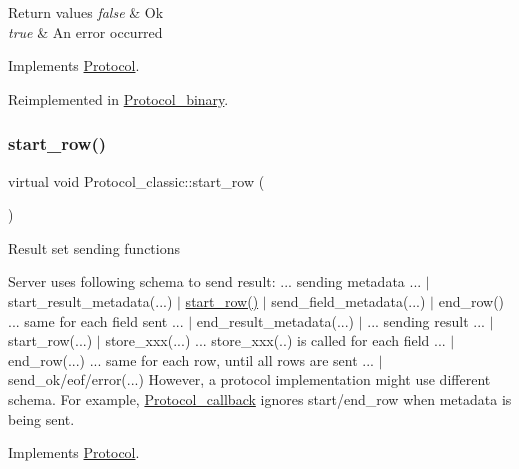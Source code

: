 \begin{DoxyRetVals}{Return values}
{\em false} & Ok \\
\hline
{\em true} & An error occurred \\
\hline
\end{DoxyRetVals}


Implements \mbox{\hyperlink{classProtocol_aa815f52ff0474421cd5db5ea5da84a85}{Protocol}}.



Reimplemented in \mbox{\hyperlink{classProtocol__binary_a2edc9bbded2ebdb50ccdcce29630d5f5}{Protocol\+\_\+binary}}.

\mbox{\label{classProtocol__classic_acebdc50db1e9403c19bb8909af300fec}} 
\subsubsection{\texorpdfstring{start\+\_\+row()}{start\_row()}}
{\footnotesize\ttfamily virtual void Protocol\+\_\+classic\+::start\+\_\+row (\begin{DoxyParamCaption}{ }\end{DoxyParamCaption})\hspace{0.3cm}{\ttfamily [pure virtual]}}

Result set sending functions

Server uses following schema to send result\+: ... sending metadata ... $\vert$ start\+\_\+result\+\_\+metadata(...) $\vert$ \mbox{\hyperlink{classProtocol__classic_acebdc50db1e9403c19bb8909af300fec}{start\+\_\+row()}} $\vert$ send\+\_\+field\+\_\+metadata(...) $\vert$ end\+\_\+row() ... same for each field sent ... $\vert$ end\+\_\+result\+\_\+metadata(...) $\vert$ ... sending result ... $\vert$ start\+\_\+row(...) $\vert$ store\+\_\+xxx(...) ... store\+\_\+xxx(..) is called for each field ... $\vert$ end\+\_\+row(...) ... same for each row, until all rows are sent ... $\vert$ send\+\_\+ok/eof/error(...) However, a protocol implementation might use different schema. For example, \mbox{\hyperlink{classProtocol__callback}{Protocol\+\_\+callback}} ignores start/end\+\_\+row when metadata is being sent. 

Implements \mbox{\hyperlink{classProtocol_a6935bf41e00716012ba86e1f5c4b055b}{Protocol}}.



